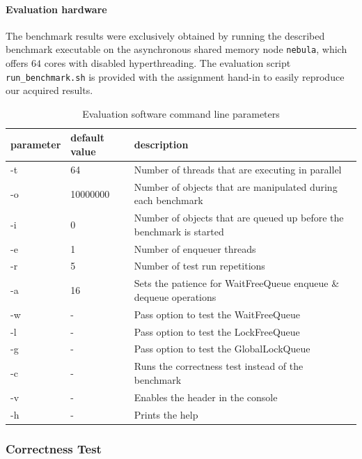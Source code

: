 \documentclass{article}
\begin{document}
\paragraph{Evaluation hardware}
The benchmark results were exclusively obtained by running the described benchmark executable on the asynchronous shared memory node \texttt{nebula}, which offers $64$ cores with disabled hyperthreading. The evaluation script \texttt{run\_benchmark.sh} is provided with the assignment hand-in to easily reproduce our acquired results.
\vspace{2em}
\begin{table}[H]
    \centering
    \begin{table}[H]
        \begin{tabular}{lll}
        \bf{parameter} & \bf{default value} & \bf{description} \\ \hline
        -t & 64 & Number of threads that are executing in parallel \\ \hline
        -o & 10000000 & Number of objects that are manipulated during each benchmark \\ \hline
        -i & 0 & Number of objects that are queued up before the benchmark is started \\ \hline
        -e & 1 & Number of enqueuer threads \\ \hline
        -r & 5 & Number of test run repetitions \\ \hline
        -a & 16 & Sets the patience for WaitFreeQueue enqueue \& dequeue operations \\ \hline
        -w & - & Pass option to test the WaitFreeQueue \\ \hline
        -l & - & Pass option to test the LockFreeQueue \\ \hline
        -g & - & Pass option to test the GlobalLockQueue \\ \hline
        -c & - & Runs the correctness test instead of the benchmark \\ \hline
        -v & - & Enables the header in the console \\ \hline
        -h & - & Prints the help
        \end{tabular}
        \end{table}
    \caption{Evaluation software command line parameters}
    \label{tbl:defaults}
\end{table}
\clearpage
\subsubsection{Correctness Test\label{sec:eval-methodology-correctness}}
\end{document}
